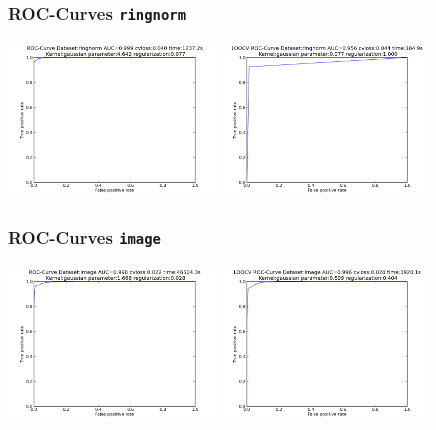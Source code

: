 \begin{frame}
	\frametitle{ROC-Curves \texttt{ringnorm}}
	\includegraphics[width=5.5cm]{../report/images/ringnorm.png}
	\includegraphics[width=5.5cm]{../report/images/ringnormLOOCV.png}
\end{frame}

\begin{frame}
	\frametitle{ROC-Curves \texttt{image}}
	\includegraphics[width=5.5cm]{../report/images/image.png}
	\includegraphics[width=5.5cm]{../report/images/imageLOOCV.png}
\end{frame}

